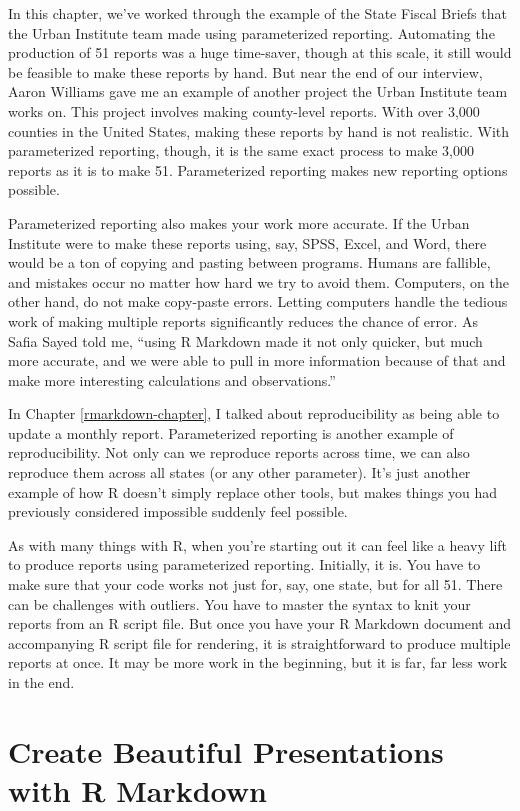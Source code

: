 \documentclass[
]{book}
\begin{document}
In this chapter, we've worked through the example of the State Fiscal Briefs that the Urban Institute team made using parameterized reporting. Automating the production of 51 reports was a huge time-saver, though at this scale, it still would be feasible to make these reports by hand. But near the end of our interview, Aaron Williams gave me an example of another project the Urban Institute team works on. This project involves making county-level reports. With over 3,000 counties in the United States, making these reports by hand is not realistic. With parameterized reporting, though, it is the same exact process to make 3,000 reports as it is to make 51. Parameterized reporting makes new reporting options possible.

Parameterized reporting also makes your work more accurate. If the Urban Institute were to make these reports using, say, SPSS, Excel, and Word, there would be a ton of copying and pasting between programs. Humans are fallible, and mistakes occur no matter how hard we try to avoid them. Computers, on the other hand, do not make copy-paste errors. Letting computers handle the tedious work of making multiple reports significantly reduces the chance of error. As Safia Sayed told me, ``using R Markdown made it not only quicker, but much more accurate, and we were able to pull in more information because of that and make more interesting calculations and observations.''

In Chapter \ref{rmarkdown-chapter}, I talked about reproducibility as being able to update a monthly report. Parameterized reporting is another example of reproducibility. Not only can we reproduce reports across time, we can also reproduce them across all states (or any other parameter). It's just another example of how R doesn't simply replace other tools, but makes things you had previously considered impossible suddenly feel possible.

As with many things with R, when you're starting out it can feel like a heavy lift to produce reports using parameterized reporting. Initially, it is. You have to make sure that your code works not just for, say, one state, but for all 51. There can be challenges with outliers. You have to master the syntax to knit your reports from an R script file. But once you have your R Markdown document and accompanying R script file for rendering, it is straightforward to produce multiple reports at once. It may be more work in the beginning, but it is far, far less work in the end.

\hypertarget{presentations-chapter}{%
\chapter{Create Beautiful Presentations with R Markdown}\label{presentations-chapter}}
\end{document}
